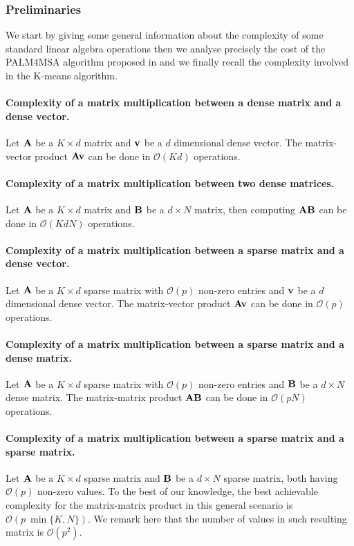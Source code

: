 \subsubsection{Preliminaries}

We start by giving some general information about the complexity of some standard linear algebra operations then we analyse precisely the cost of the PALM4MSA algorithm proposed in 
\cite{magoarou2014learning}  and we finally recall the complexity involved in the K-means algorithm.

\paragraph{Complexity of a matrix multiplication between a dense matrix and a dense vector.}
Let ${\mathbf{A}}$ be a $K \times d $ matrix and ${\mathbf{v}}$ be a $d$ dimensional dense vector. The matrix-vector product ${\mathbf{A}}{\mathbf{v}}$ can be done in $\mathcal{O}\left(Kd \right)$ operations.

\paragraph{Complexity of a matrix multiplication between two dense matrices.}
Let ${\mathbf{A}}$ be a $K \times d $ matrix and ${\mathbf{B}}$ be a $d \times N$ matrix, then computing ${\mathbf{A}} {\mathbf{B}}$ can be done in $\mathcal{O}\left (KdN \right )$ operations.

\paragraph{Complexity of a matrix multiplication between a sparse matrix and a dense vector.}
Let ${\mathbf{A}}$ be a $K \times d$ sparse matrix with $\mathcal{O}(p)$ non-zero entries and ${\mathbf{v}}$ be a $d$ dimensional dense vector. The matrix-vector product ${\mathbf{A}}{\mathbf{v}}$ can be done in $\mathcal{O}\left(p \right)$ operations.

\paragraph{Complexity of a matrix multiplication between a sparse matrix and a dense matrix.}
Let ${\mathbf{A}}$ be a $K \times d$ sparse matrix with $\mathcal{O}(p)$ non-zero entries and ${\mathbf{B}}$ be a $d \times N$ dense matrix. The matrix-matrix product ${\mathbf{A}}{\mathbf{B}}$ can be done in $\mathcal{O}\left(p N\right)$ operations.

\paragraph{Complexity of a matrix multiplication between a sparse matrix and a sparse matrix.}
Let ${\mathbf{A}}$ be a $K \times d $ sparse matrix and ${\mathbf{B}}$ be a $d \times N$ sparse matrix, both having $\mathcal{O}(p)$ non-zero values.
To the best of our knowledge, the best achievable complexity for the matrix-matrix product in this general scenario is $\mathcal{O}(p~\min{\{K, N\}})$. We remark here that the number of values in such resulting matrix is $\mathcal{O}(p^2)$.

